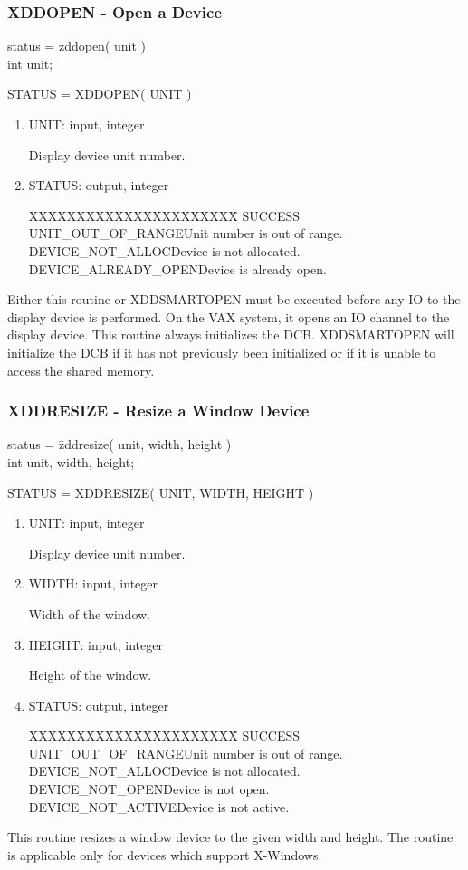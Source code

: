 \subsubsection{XDDOPEN - Open a Device}
\begin{tabbing}
status = \=zddopen( unit )\\
\>int  unit;\\
\end{tabbing}
STATUS = XDDOPEN( UNIT )
\begin{enumerate}
\item UNIT:  input, integer

Display device unit number.
\item STATUS:  output, integer
\begin{tabbing}
XXXXXXXXXXXXXXXXXXXXXX\=\kill
SUCCESS\\
UNIT\_OUT\_OF\_RANGE\>Unit number is out of range.\\
DEVICE\_NOT\_ALLOC\>Device is not allocated.\\
DEVICE\_ALREADY\_OPEN\>Device is already open.\\
\end{tabbing}
\end{enumerate}
Either this routine or XDDSMARTOPEN must be executed before any IO
to the display device is performed.  On the VAX system, it opens an
IO channel to the display device.  This routine always initializes the
DCB.  XDDSMARTOPEN will initialize the DCB if it has not previously
been initialized or if it is unable to access the shared memory.
\newpage
\subsubsection{XDDRESIZE - Resize a Window Device}
\begin{tabbing}
status = \=zddresize( unit, width, height )\\
\>int  unit, width, height;\\
\end{tabbing}
STATUS = XDDRESIZE( UNIT, WIDTH, HEIGHT )
\begin{enumerate}
\item UNIT:  input, integer

Display device unit number.
\item WIDTH:  input, integer

Width of the window.
\item HEIGHT:  input, integer

Height of the window.
\item STATUS:  output, integer
\begin{tabbing}
XXXXXXXXXXXXXXXXXXXXXX\=\kill
SUCCESS\\
UNIT\_OUT\_OF\_RANGE\>Unit number is out of range.\\
DEVICE\_NOT\_ALLOC\>Device is not allocated.\\
DEVICE\_NOT\_OPEN\>Device is not open.\\
DEVICE\_NOT\_ACTIVE\>Device is not active.\\
\end{tabbing}
\end{enumerate}
This routine resizes a window device to the given width and height.  The
routine is applicable only for devices which support X-Windows.
\newpage
